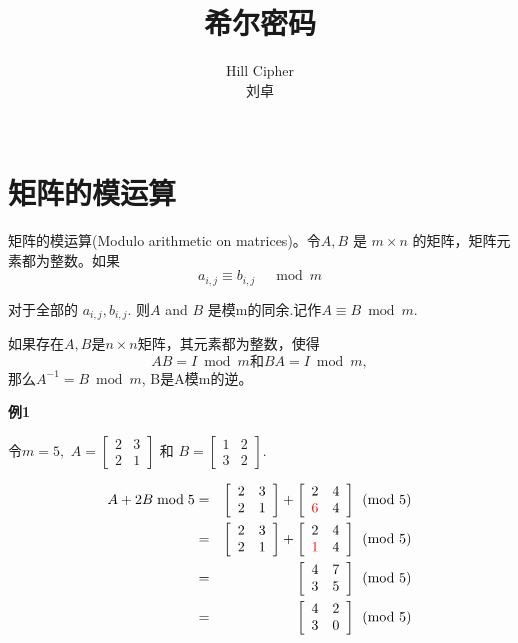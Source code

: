 \documentclass{article}
\date{}
\title{希尔密码}
\author{
Hill Cipher\\
 刘卓\\
 \texttt{ } \\
}
\begin{document}
\maketitle

\section{矩阵的模运算}
矩阵的模运算(Modulo arithmetic on matrices)。令$A, B$ 是 $m \times n$ 的矩阵，矩阵元素都为整数。如果
$$
a_{i, j} \equiv b_{i, j} \quad \bmod m
$$

对于全部的 $a_{i, j}, b_{i, j}$. 则$A$ and $B$ 是模m的同余.记作$A \equiv B \bmod m$.

如果存在$A,B $是$ n \times n$矩阵，其元素都为整数，使得
$$AB = I \bmod m \mbox{和} BA = I \bmod m,$$那么$A^{-1} = B \bmod m$, B是A模m的逆。


\textbf{例1}

令$m = 5,$ $A=\left[\begin{array}{ll}2 & 3 \\ 2 & 1\end{array}\right]$ 和 $B=\left[\begin{array}{ll}1 & 2 \\ 3 & 2\end{array}\right] .$

\begin{eqnarray}   
\label{eq}
A+2 B \bmod 5&=& \left[\begin{array}{ll}
2 & 3 \\
2 & 1
\end{array}\right]+\left[\begin{array}{ll}
2 & 4 \\
{\color{red}6} & 4
\end{array}\right] \pmod{5} \nonumber \\ 
&=& \left[\begin{array}{ll}
2 & 3 \\
2 & 1
\end{array}\right]+\left[\begin{array}{ll}
2 & 4 \\
{\color{red}1} & 4
\end{array}\right] \pmod{5} \nonumber \\ 
&=& \left[\begin{array}{ll}
4 & 7 \\
3 & 5
\end{array}\right]  \pmod{5}  \nonumber \\ 
&=& \left[\begin{array}{ll}
4 & 2 \\
3 & 0
\end{array}\right]  \pmod{5}  \nonumber \\ 
\nonumber 
\end{eqnarray}
\end{document}
